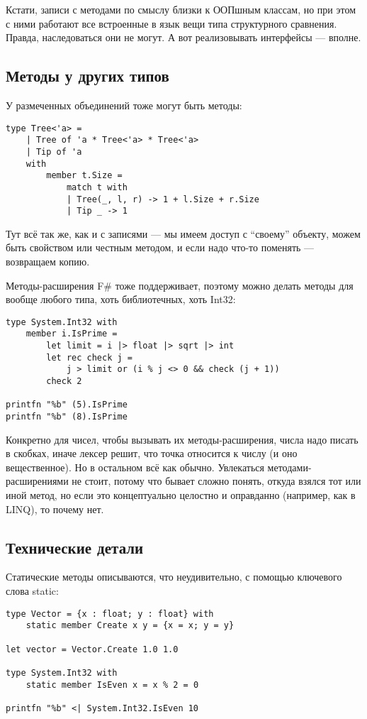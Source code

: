 \documentclass{../../text-style}
\begin{document}
Кстати, записи с методами по смыслу близки к ООПшным классам, но при этом с ними работают все встроенные в язык вещи типа структурного сравнения.
Правда, наследоваться они не могут.
А вот реализовывать интерфейсы --- вполне.

\subsection{Методы у других типов}

У размеченных объединений тоже могут быть методы:

\begin{verbatim}
type Tree<'a> =
    | Tree of 'a * Tree<'a> * Tree<'a>
    | Tip of 'a
    with
        member t.Size = 
            match t with
            | Tree(_, l, r) -> 1 + l.Size + r.Size
            | Tip _ -> 1
\end{verbatim}

Тут всё так же, как и с записями --- мы имеем доступ с \enquote{своему} объекту, можем быть свойством или честным методом, и если надо что-то поменять --- возвращаем копию.

Методы-расширения F\# тоже поддерживает, поэтому можно делать методы для вообще любого типа, хоть библиотечных, хоть Int32:

\begin{verbatim}
type System.Int32 with
    member i.IsPrime = 
        let limit = i |> float |> sqrt |> int
        let rec check j =
            j > limit or (i % j <> 0 && check (j + 1))
        check 2

printfn "%b" (5).IsPrime
printfn "%b" (8).IsPrime
\end{verbatim}

Конкретно для чисел, чтобы вызывать их методы-расширения, числа надо писать в скобках, иначе лексер решит, что точка относится к числу (и оно вещественное).
Но в остальном всё как обычно.
Увлекаться методами-расширениями не стоит, потому что бывает сложно понять, откуда взялся тот или иной метод, но если это концептуально целостно и оправданно (например, как в LINQ), то почему нет.

\subsection{Технические детали}

Статические методы описываются, что неудивительно, с помощью ключевого слова static:

\begin{verbatim}
type Vector = {x : float; y : float} with
    static member Create x y = {x = x; y = y}

let vector = Vector.Create 1.0 1.0

type System.Int32 with
    static member IsEven x = x % 2 = 0

printfn "%b" <| System.Int32.IsEven 10
\end{verbatim}
\end{document}
